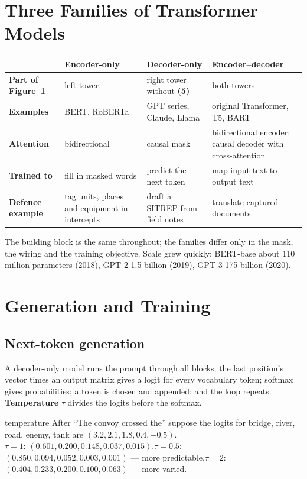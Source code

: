 \documentclass[11pt]{article}
\newcommand{\blk}[1]{\textbf{(#1)}}
\begin{document}
\section{Three Families of Transformer Models}
\begin{center}\small\renewcommand{\arraystretch}{1.3}
\begin{tabularx}{\textwidth}{>{\bfseries}p{2.4cm} X X X}\toprule
 & \textbf{Encoder-only} & \textbf{Decoder-only} & \textbf{Encoder--decoder}\\\midrule
Part of Figure~1 & left tower & right tower without \blk5 & both towers\\
Examples & BERT, RoBERTa & GPT series, Claude, Llama & original Transformer, T5, BART\\
Attention & bidirectional & causal mask & bidirectional encoder; causal decoder with cross-attention\\
Trained to & fill in masked words & predict the next token & map input text to output text\\
Defence example & tag units, places and equipment in intercepts & draft a SITREP from field notes & translate captured documents\\\bottomrule
\end{tabularx}\end{center}
The building block is the same throughout; the families differ only in the mask, the wiring and the training objective. Scale grew quickly: BERT-base about 110 million parameters (2018), GPT-2 1.5 billion (2019), GPT-3 175 billion (2020).

\section{Generation and Training}
\subsection{Next-token generation}
A decoder-only model runs the prompt through all blocks; the last position's vector times an output matrix gives a logit for every vocabulary token; softmax gives probabilities; a token is chosen and appended; and the loop repeats. \textbf{Temperature} $\tau$ divides the logits before the softmax.
\begin{example}{temperature}
After ``The convoy crossed the'' suppose the logits for bridge, river, road, enemy, tank are $(3.2,2.1,1.8,0.4,-0.5)$.\\
$\tau=1$: $(0.601,0.200,0.148,0.037,0.015)$.\quad $\tau=0.5$: $(0.850,0.094,0.052,0.003,0.001)$ --- more predictable.\quad $\tau=2$: $(0.404,0.233,0.200,0.100,0.063)$ --- more varied.
\end{example}
\end{document}
